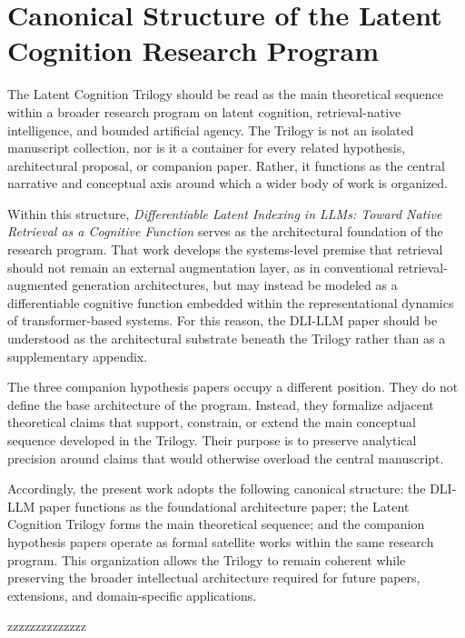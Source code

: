 \section{Canonical Structure of the Latent Cognition Research Program}

The Latent Cognition Trilogy should be read as the main theoretical sequence within a broader research program on latent cognition, retrieval-native intelligence, and bounded artificial agency. The Trilogy is not an isolated manuscript collection, nor is it a container for every related hypothesis, architectural proposal, or companion paper. Rather, it functions as the central narrative and conceptual axis around which a wider body of work is organized.

Within this structure, \textit{Differentiable Latent Indexing in LLMs: Toward Native Retrieval as a Cognitive Function} serves as the architectural foundation of the research program. That work develops the systems-level premise that retrieval should not remain an external augmentation layer, as in conventional retrieval-augmented generation architectures, but may instead be modeled as a differentiable cognitive function embedded within the representational dynamics of transformer-based systems. For this reason, the DLI-LLM paper should be understood as the architectural substrate beneath the Trilogy rather than as a supplementary appendix.

The three companion hypothesis papers occupy a different position. They do not define the base architecture of the program. Instead, they formalize adjacent theoretical claims that support, constrain, or extend the main conceptual sequence developed in the Trilogy. Their purpose is to preserve analytical precision around claims that would otherwise overload the central manuscript.

Accordingly, the present work adopts the following canonical structure: the DLI-LLM paper functions as the foundational architecture paper; the Latent Cognition Trilogy forms the main theoretical sequence; and the companion hypothesis papers operate as formal satellite works within the same research program. This organization allows the Trilogy to remain coherent while preserving the broader intellectual architecture required for future papers, extensions, and domain-specific applications.        









zzzzzzzzzzzzzz
